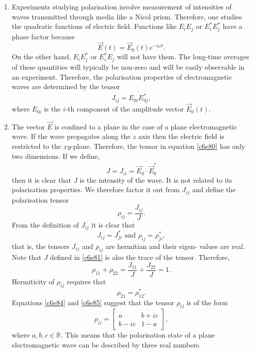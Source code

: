 \begin{enumerate}
\item Experiments studying polarisation involve measurement of intensities of
waves transmitted through media like a Nicol prism. Therefore, one studies the
quadratic functions of electric field. Functions like $E_iE_j$ or $E_i^\ast
E_j^\ast$ have a phase factor because
\begin{equation}\label{c6e79}
\vec{E}(t) = \vec{E}_0(t)e^{-i\omega t}.
\end{equation}
On the other hand, $E_iE_j^\ast$ or $E_i^\ast E_j$ will not have them. The 
long-time averages of these quantities will typically be non-zero and will be
easily observable in an experiment. Therefore, the polarisation properties
of electromagnetic waves are determined by the tensor
\begin{equation}\label{c6e80}
J_{ij} = \overline{E_{0i}{E_{0j}^\ast}},
\end{equation}
where $E_{0i}$ is the $i$-th component of the amplitude vector $\vec{E}_0(t)$.

\item The vector $\vec{E}$ is confined to a plane in the case of a plane 
electromagnetic wave. If the wave propagates along the $z$ axis then the
electric field is restricted to the $xy$-plane. Therefore, the tensor in
equation \eqref{c6e80} has only two dimensions. If we define,
\begin{equation}\label{c6e81}
J = J_{ii} = \overline{\vec{E}_0\cdot\vec{E}_0^\ast}
\end{equation}
then it is clear that $J$ is the intensity of the wave. It is not related
to its polarisation properties. We therefore factor it out from $J_{ij}$ and
define the polarisation tensor
\begin{equation}\label{c6e82}
\rho_{ij} = \frac{J_{ij}}{J}.
\end{equation}
From the definition of $J_{ij}$ it is clear that
\begin{equation}\label{c6e83}
J_{ij} = J_{ji}^\ast \text{ and } \rho_{ij} = \rho_{ji}^\ast,
\end{equation}
that is, the tensors $J_{ij}$ and $\rho_{ij}$ are hermitian and their eigen-
values are real. Note that $J$ defined in \eqref{c6e81} is also the trace of the
tensor. Therefore,
\begin{equation}\label{c6e84}
\rho_{11} + \rho_{22} = \frac{J_{11}}{J} + \frac{J_{22}}{J} = 1.
\end{equation}
Hermiticity of $\rho_{ij}$ requires that
\begin{equation}\label{c6e85}
\rho_{21} = \rho_{12}^\ast.
\end{equation}
Equations \eqref{c6e84} and \eqref{c6e85} suggest that the tensor $\rho_{ij}$ is
of the form
\begin{equation}\label{c6e86}
\rho_{ij} = \begin{bmatrix}a & b + ic \\ b - ic & 1 - a \end{bmatrix},
\end{equation}
where $a, b, c \in \mathbb{R}$. This means that the polarisation state of a 
plane electromagnetic wave can be described by three real numbers.


\end{enumerate}
